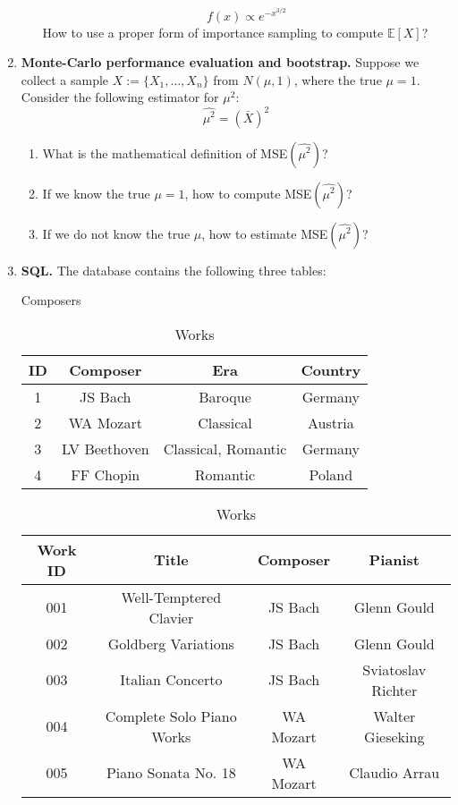 \documentclass[11pt]{article}
\newcommand{\ep}{\mathbb{E}}
\begin{document}
\begin{enumerate}
\begin{enumerate}
		$$
		f(x)\propto e^{-x^{3/2}}
		$$
		How to use a proper form of importance sampling to compute $\ep[X]$?
	\end{enumerate}
	\item {\bf Monte-Carlo performance evaluation and bootstrap.} Suppose we collect a sample $X:=\{X_1,\ldots,X_n\}$ from $N(\mu, 1)$, where the true $\mu=1$. Consider the following estimator for $\mu^2$:
	$$
	\widehat{\mu^2} = \left(\bar{X}\right)^2
	$$
	\begin{enumerate}
		\item What is the mathematical definition of MSE$(\widehat{\mu^2})$?
		\item If we know the true $\mu=1$, how to compute MSE$(\widehat{\mu^2})$?
		\item If we do not know the true $\mu$, how to estimate MSE$(\widehat{\mu^2})$?
	\end{enumerate}
	\newpage
	\item {\bf SQL.} The database contains the following three tables:
	\begin{table}[H]
		\centering
		\caption{Composers}
		\begin{tabular}{cccc}\hline
			ID & Composer & Era & Country\\\hline
			1  & JS Bach  & Baroque & Germany\\
			2  & WA Mozart & Classical & Austria\\
			3  & LV Beethoven & Classical, Romantic & Germany\\
			4  & FF Chopin & Romantic & Poland\\\hline
		\end{tabular}
		\caption{Works}
		\begin{tabular}{cccc}\hline
			Work ID & Title & Composer & Pianist\\\hline
			001 & Well-Temptered Clavier & JS Bach & Glenn Gould\\
			002 & Goldberg Variations & JS Bach & Glenn Gould\\
			003 & Italian Concerto & JS Bach & Sviatoslav Richter\\
			004 & Complete Solo Piano Works & WA Mozart & Walter Gieseking\\
			005 & Piano Sonata No. 18 & WA Mozart & Claudio Arrau\\

\end{tabular}
\end{table}
\end{enumerate}
\end{document}
